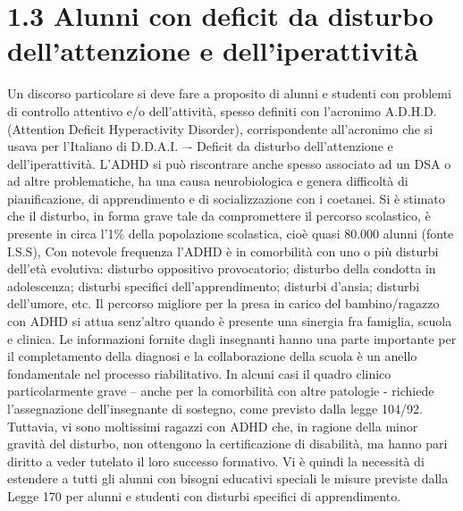 \section*{1.3 Alunni con deficit da disturbo dell'attenzione e dell'iperattività}
Un discorso particolare si deve fare a proposito di alunni e studenti con problemi di controllo attentivo e/o
dell'attività, spesso definiti con l'acronimo A.D.H.D. (Attention Deficit Hyperactivity Disorder),
corrispondente all'acronimo che si usava per l'Italiano di D.D.A.I. –- Deficit da disturbo dell'attenzione e
dell'iperattività.
L'ADHD si può riscontrare anche spesso associato ad un DSA o ad altre problematiche, ha una causa
neurobiologica e genera difficoltà di pianificazione, di apprendimento e di socializzazione con i coetanei. Si
è stimato che il disturbo, in forma grave tale da compromettere il percorso scolastico, è presente in circa l'1\%
della popolazione scolastica, cioè quasi 80.000 alunni (fonte I.S.S),
Con notevole frequenza l'ADHD è in comorbilità con uno o più disturbi dell'età evolutiva: disturbo
oppositivo provocatorio; disturbo della condotta in adolescenza; disturbi specifici dell'apprendimento;
disturbi d'ansia; disturbi dell'umore, etc.
Il percorso migliore per la presa in carico del bambino/ragazzo con ADHD si attua senz'altro quando è
presente una sinergia fra famiglia, scuola e clinica. Le informazioni fornite dagli insegnanti hanno una parte
importante per il completamento della diagnosi e la collaborazione della scuola è un anello fondamentale nel
processo riabilitativo.
In alcuni casi il quadro clinico particolarmente grave – anche per la comorbilità con altre patologie - richiede
l'assegnazione dell'insegnante di sostegno, come previsto dalla legge 104/92. Tuttavia, vi sono moltissimi
ragazzi con ADHD che, in ragione della minor gravità del disturbo, non ottengono la certificazione di
disabilità, ma hanno pari diritto a veder tutelato il loro successo formativo.
Vi è quindi la necessità di estendere a tutti gli alunni con bisogni educativi speciali le misure previste dalla
Legge 170 per alunni e studenti con disturbi specifici di apprendimento.
